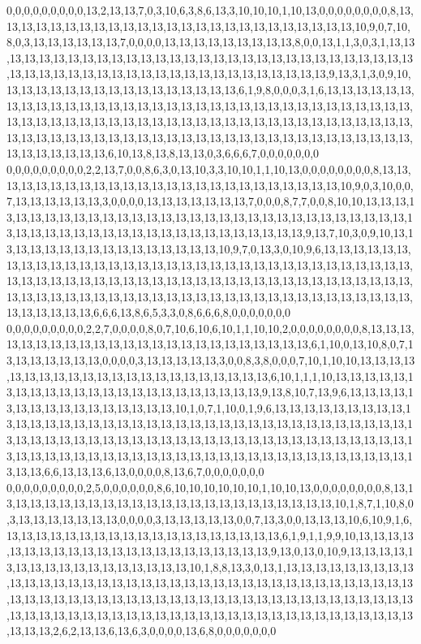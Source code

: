 0,0,0,0,0,0,0,0,0,13,2,13,13,7,0,3,10,6,3,8,6,13,3,10,10,10,1,10,13,0,0,0,0,0,0,0,0,8,13,13,13,13,13,13,13,13,13,13,13,13,13,13,13,13,13,13,13,13,13,13,13,13,13,10,9,0,7,10,8,0,3,13,13,13,13,13,13,7,0,0,0,0,13,13,13,13,13,13,13,13,13,8,0,0,13,1,1,3,0,3,1,13,13,13,13,13,13,13,13,13,13,13,13,13,13,13,13,13,13,13,13,13,13,13,13,13,13,13,13,13,13,13,13,13,13,13,13,13,13,13,13,13,13,13,13,13,13,13,13,13,13,13,13,9,13,3,1,3,0,9,10,13,13,13,13,13,13,13,13,13,13,13,13,13,13,13,13,6,1,9,8,0,0,0,3,1,6,13,13,13,13,13,13,13,13,13,13,13,13,13,13,13,13,13,13,13,13,13,13,13,13,13,13,13,13,13,13,13,13,13,13,13,13,13,13,13,13,13,13,13,13,13,13,13,13,13,13,13,13,13,13,13,13,13,13,13,13,13,13,13,13,13,13,13,13,13,13,13,13,13,13,13,13,13,13,13,13,13,13,13,13,13,13,13,13,13,13,13,13,13,13,13,13,13,6,10,13,8,13,8,13,13,0,3,6,6,6,7,0,0,0,0,0,0,0
0,0,0,0,0,0,0,0,0,2,2,13,7,0,0,8,6,3,0,13,10,3,3,10,10,1,1,10,13,0,0,0,0,0,0,0,0,8,13,13,13,13,13,13,13,13,13,13,13,13,13,13,13,13,13,13,13,13,13,13,13,13,13,10,9,0,3,10,0,0,7,13,13,13,13,13,13,3,0,0,0,0,13,13,13,13,13,13,13,7,0,0,0,8,7,7,0,0,8,10,10,13,13,13,13,13,13,13,13,13,13,13,13,13,13,13,13,13,13,13,13,13,13,13,13,13,13,13,13,13,13,13,13,13,13,13,13,13,13,13,13,13,13,13,13,13,13,13,13,13,13,13,13,9,13,7,10,3,0,9,10,13,13,13,13,13,13,13,13,13,13,13,13,13,13,13,13,10,9,7,0,13,3,0,10,9,6,13,13,13,13,13,13,13,13,13,13,13,13,13,13,13,13,13,13,13,13,13,13,13,13,13,13,13,13,13,13,13,13,13,13,13,13,13,13,13,13,13,13,13,13,13,13,13,13,13,13,13,13,13,13,13,13,13,13,13,13,13,13,13,13,13,13,13,13,13,13,13,13,13,13,13,13,13,13,13,13,13,13,13,13,13,13,13,13,13,13,13,13,13,13,13,13,6,6,6,13,8,6,5,3,3,0,8,6,6,6,8,0,0,0,0,0,0,0
0,0,0,0,0,0,0,0,0,2,2,7,0,0,0,0,8,0,7,10,6,10,6,10,1,1,10,10,2,0,0,0,0,0,0,0,0,8,13,13,13,13,13,13,13,13,13,13,13,13,13,13,13,13,13,13,13,13,13,13,13,13,6,1,10,0,13,10,8,0,7,13,13,13,13,13,13,13,0,0,0,0,3,13,13,13,13,13,3,0,0,8,3,8,0,0,0,7,10,1,10,10,13,13,13,13,13,13,13,13,13,13,13,13,13,13,13,13,13,13,13,13,13,13,6,10,1,1,1,10,13,13,13,13,13,13,13,13,13,13,13,13,13,13,13,13,13,13,13,13,13,13,13,9,13,8,10,7,13,9,6,13,13,13,13,13,13,13,13,13,13,13,13,13,13,13,13,10,1,0,7,1,10,0,1,9,6,13,13,13,13,13,13,13,13,13,13,13,13,13,13,13,13,13,13,13,13,13,13,13,13,13,13,13,13,13,13,13,13,13,13,13,13,13,13,13,13,13,13,13,13,13,13,13,13,13,13,13,13,13,13,13,13,13,13,13,13,13,13,13,13,13,13,13,13,13,13,13,13,13,13,13,13,13,13,13,13,13,13,13,13,13,13,13,13,13,13,13,13,13,13,13,13,6,6,13,13,13,6,13,0,0,0,0,8,13,6,7,0,0,0,0,0,0,0
0,0,0,0,0,0,0,0,0,2,5,0,0,0,0,0,0,8,6,10,10,10,10,10,10,1,10,10,13,0,0,0,0,0,0,0,0,8,13,13,13,13,13,13,13,13,13,13,13,13,13,13,13,13,13,13,13,13,13,13,13,13,10,1,8,7,1,10,8,0,3,13,13,13,13,13,13,13,0,0,0,0,3,13,13,13,13,13,0,0,7,13,3,0,0,13,13,13,10,6,10,9,1,6,13,13,13,13,13,13,13,13,13,13,13,13,13,13,13,13,13,13,13,6,1,9,1,1,9,9,10,13,13,13,13,13,13,13,13,13,13,13,13,13,13,13,13,13,13,13,13,13,13,9,13,0,13,0,10,9,13,13,13,13,13,13,13,13,13,13,13,13,13,13,13,13,13,10,1,8,8,13,3,0,13,1,13,13,13,13,13,13,13,13,13,13,13,13,13,13,13,13,13,13,13,13,13,13,13,13,13,13,13,13,13,13,13,13,13,13,13,13,13,13,13,13,13,13,13,13,13,13,13,13,13,13,13,13,13,13,13,13,13,13,13,13,13,13,13,13,13,13,13,13,13,13,13,13,13,13,13,13,13,13,13,13,13,13,13,13,13,13,13,13,13,13,13,13,13,13,13,13,2,6,2,13,13,6,13,6,3,0,0,0,0,13,6,8,0,0,0,0,0,0,0
